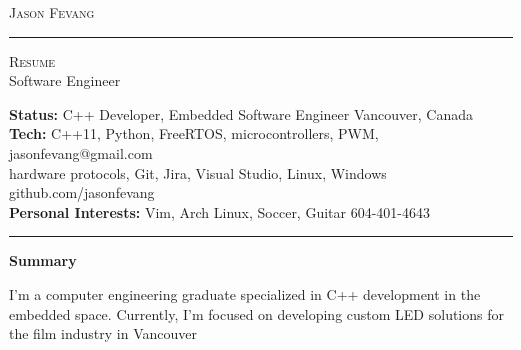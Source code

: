 \documentclass[10pt,A4]{article}
\newcommand{\cvsection}[1]
{
	\begin{center}
		\large\textcolor{sectcol}{\textbf{#1}}
	\end{center}
}
\newcommand{\metasection}[2]
{
\footnotesize{#2} \hspace*{\fill} \footnotesize{#1}\\[1pt]
}
\begin{document}
\pagestyle{fancy}	








\vspace{-8pt}
\begin{center}
	\HUGE \textsc{Jason Fevang} \textcolor{sectcol}{\rule[-1mm]{1mm}{0.9cm}} \textsc{Resume}\\[2pt]
	\small Software Engineer
\end{center}



\vspace{6pt}


\metasection{Vancouver, Canada}{\textbf{Status:} C++ Developer, Embedded Software Engineer}
\metasection{jasonfevang@gmail.com}{\textbf{Tech:} C++11, Python, FreeRTOS, microcontrollers, PWM, } 
\metasection{github.com/jasonfevang}{hardware protocols, Git, Jira, Visual Studio, Linux, Windows}
\metasection{604-401-4643}{\textbf{Personal Interests:} Vim, Arch Linux, Soccer, Guitar}
\vspace{-2pt}
\textcolor{softcol}{\hrule}
\vspace{6pt}

\normalsize

\vspace{-6pt}
\cvsection{Summary}
I'm a computer engineering graduate specialized in C++ development in the embedded space. Currently, I'm focused on developing custom LED solutions for the film industry in Vancouver\\
\end{document}
